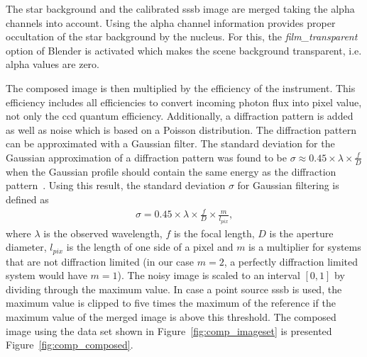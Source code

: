 The star background and the calibrated \gls{sssb} image are merged taking the alpha channels into account. Using the alpha channel information provides proper occultation of the star background by the nucleus. For this, the \textit{film\_transparent} option of Blender is activated which makes the scene background transparent, i.e. alpha values are zero.

The composed image is then multiplied by the efficiency of the instrument. This efficiency includes all efficiencies to convert incoming photon flux into pixel value, not only the \gls{ccd} quantum efficiency. Additionally, a diffraction pattern is added as well as noise which is based on a Poisson distribution. The diffraction pattern can be approximated with a Gaussian filter. The standard deviation for the Gaussian approximation of a diffraction pattern was found to be $\sigma \approx 0.45 \times \lambda \times \frac{f}{D}$ when the Gaussian profile should contain the same energy as the diffraction pattern~\cite{Zhang2007GaussianModels}. Using this result, the standard deviation $\sigma$ for Gaussian filtering is defined as
\begin{align}
    \sigma = 0.45 \times \lambda \times \frac{f}{D} \times \frac{m}{l_{pix}}, \label{eq:comp_sigma}
\end{align}
where $\lambda$ is the observed wavelength, $f$ is the focal length, $D$ is the aperture diameter, $l_{pix}$ is the length of one side of a pixel and $m$ is a multiplier for systems that are not diffraction limited (in our case $m = 2$, a perfectly diffraction limited system would have $m = 1$). The noisy image is scaled to an interval $[0,1]$ by dividing through the maximum value. In case a point source \gls{sssb} is used, the maximum value is clipped to five times the maximum of the reference if the maximum value of the merged image is above this threshold. The composed image using the data set shown in Figure~\ref{fig:comp_imageset} is presented Figure~\ref{fig:comp_composed}.

